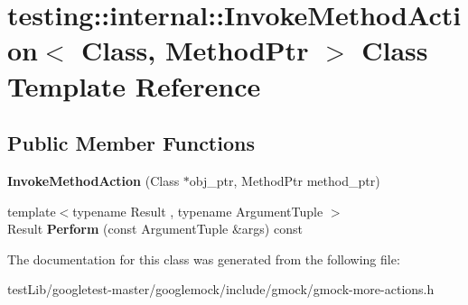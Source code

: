 \hypertarget{classtesting_1_1internal_1_1InvokeMethodAction}{}\section{testing\+:\+:internal\+:\+:Invoke\+Method\+Action$<$ Class, Method\+Ptr $>$ Class Template Reference}
\label{classtesting_1_1internal_1_1InvokeMethodAction}
\subsection*{Public Member Functions}
\begin{DoxyCompactItemize}
\item 
\mbox{\label{classtesting_1_1internal_1_1InvokeMethodAction_a16e545f6166e2d54eeafdc2ab3adf06b}} 
{\bfseries Invoke\+Method\+Action} (Class $\ast$obj\+\_\+ptr, Method\+Ptr method\+\_\+ptr)
\item 
\mbox{\label{classtesting_1_1internal_1_1InvokeMethodAction_aed6971c668bc2c7671d512306b25b1ab}} 
{\footnotesize template$<$typename Result , typename Argument\+Tuple $>$ }\\Result {\bfseries Perform} (const Argument\+Tuple \&args) const
\end{DoxyCompactItemize}


The documentation for this class was generated from the following file\+:\begin{DoxyCompactItemize}
\item 
test\+Lib/googletest-\/master/googlemock/include/gmock/gmock-\/more-\/actions.\+h\end{DoxyCompactItemize}
